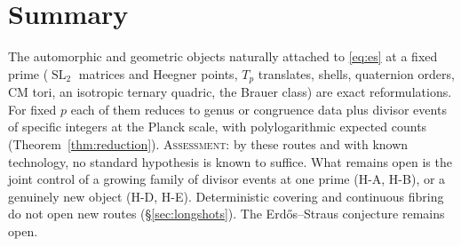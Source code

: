 \documentclass[10pt,reqno]{amsart}
\theoremstyle{definition}
\numberwithin{equation}{section}
\DeclareMathOperator{\SL}{SL}
\newcommand{\status}[1]{\textup{\textsc{#1}}}
\begin{document}
\section{Summary}
The automorphic and geometric objects naturally attached to
\eqref{eq:es} at a fixed prime ($\SL_2$ matrices and Heegner points, $T_p$
translates, shells, quaternion orders, CM tori, an isotropic ternary
quadric, the Brauer class) are exact reformulations. For fixed $p$ each of
them reduces to genus or congruence data plus divisor events of specific
integers at the Planck scale, with polylogarithmic expected counts
(Theorem~\ref{thm:reduction}). \status{Assessment:} by these routes and
with known technology, no standard hypothesis is known to suffice. What
remains open is the joint control of a growing family of divisor events at
one prime (H-A, H-B), or a genuinely new object (H-D, H-E). Deterministic covering
and continuous fibring do not open new routes (\S\ref{sec:longshots}). The
Erd\H{o}s--Straus conjecture remains open.
\end{document}
